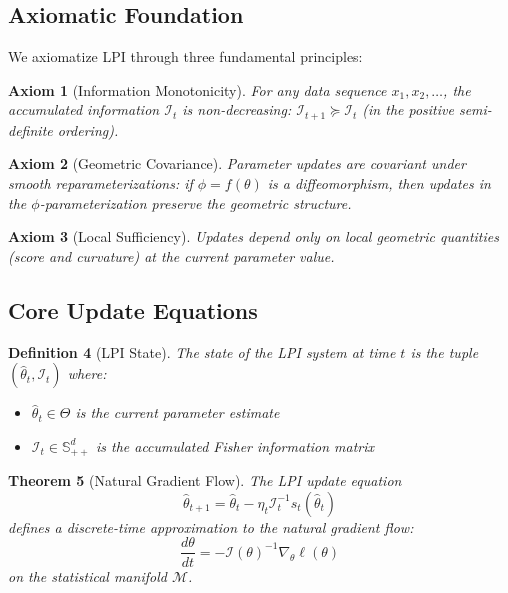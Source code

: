 \documentclass[11pt]{article}
\newtheorem{theorem}{Theorem}
\newtheorem{definition}[theorem]{Definition}
\newtheorem{axiom}[theorem]{Axiom}
\begin{document}
\subsection{Axiomatic Foundation}

We axiomatize LPI through three fundamental principles:

\begin{axiom}[Information Monotonicity]
For any data sequence $x_1, x_2, \ldots$, the accumulated information $\mathcal{I}_t$ is non-decreasing: $\mathcal{I}_{t+1} \succeq \mathcal{I}_t$ (in the positive semi-definite ordering).
\end{axiom}

\begin{axiom}[Geometric Covariance]
Parameter updates are covariant under smooth reparameterizations: if $\phi = f(\theta)$ is a diffeomorphism, then updates in the $\phi$-parameterization preserve the geometric structure.
\end{axiom}

\begin{axiom}[Local Sufficiency]
Updates depend only on local geometric quantities (score and curvature) at the current parameter value.
\end{axiom}

\subsection{Core Update Equations}

\begin{definition}[LPI State]
The state of the LPI system at time $t$ is the tuple $(\hat{\theta}_t, \mathcal{I}_t)$ where:
\begin{itemize}
\item $\hat{\theta}_t \in \Theta$ is the current parameter estimate
\item $\mathcal{I}_t \in \mathbb{S}^d_{++}$ is the accumulated Fisher information matrix
\end{itemize}
\end{definition}

\begin{theorem}[Natural Gradient Flow]
\label{thm:natural_gradient}
The LPI update equation
\begin{equation}
\hat{\theta}_{t+1} = \hat{\theta}_t - \eta_t \mathcal{I}_t^{-1} s_t(\hat{\theta}_t)
\end{equation}
defines a discrete-time approximation to the natural gradient flow:
\begin{equation}
\frac{d\theta}{dt} = -\mathcal{I}(\theta)^{-1} \nabla_\theta \ell(\theta)
\end{equation}
on the statistical manifold $\mathcal{M}$.
\end{theorem}
\end{document}

